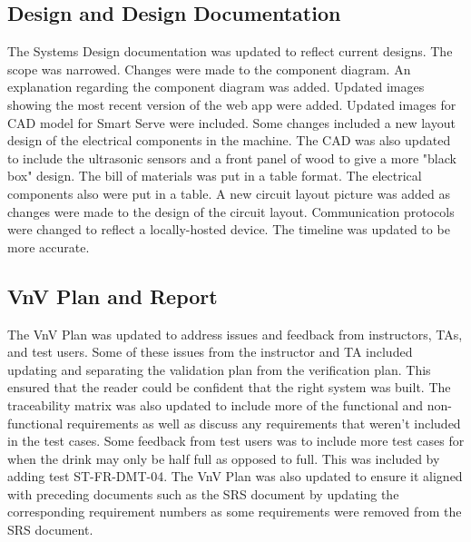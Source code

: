 \documentclass{article}
\begin{document}
\subsection{Design and Design Documentation}
The Systems Design documentation was updated to reflect current designs. The scope was narrowed. Changes were made to the component diagram. An explanation regarding the component diagram was added. Updated images showing the most recent version of the web app were added. Updated images for CAD model for Smart Serve were included. Some changes included a new layout design of the electrical components in the machine. The CAD was also updated to include the ultrasonic sensors and a front panel of wood to give a more "black box" design. The bill of materials was put in a table format. The electrical components also were put in a table. A new circuit layout picture was added as changes were made to the design of the circuit layout. Communication protocols were changed to reflect a locally-hosted device. The timeline was updated to be more accurate.

\subsection{VnV Plan and Report}
The VnV Plan was updated to address issues and feedback from instructors, TAs, and test users. Some of these issues from the instructor and TA included updating and separating the validation plan from the verification plan. This ensured that the reader could be confident that the right system was built. The traceability matrix was also updated to include more of the functional and non-functional requirements as well as discuss any requirements that weren't included in the test cases. Some feedback from test users was to include more test cases for when the drink may only be half full as opposed to full. This was included by adding test ST-FR-DMT-04. The VnV Plan was also updated to ensure it aligned with preceding documents such as the SRS document by updating the corresponding requirement numbers as some requirements were removed from the SRS document.\\

\end{document}
